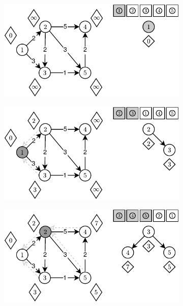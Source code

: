 \begin{figure}[!htbp]
	\centering
	\begin{subfigure}[b]{0.33\textwidth}
		\includegraphics[width=\textwidth]{Chapter_II/R-HEAP-Example/a.pdf}
		\caption{}
	\end{subfigure}%
	\begin{subfigure}[b]{0.33\textwidth}
		\includegraphics[width=\textwidth]{Chapter_II/R-HEAP-Example/b.pdf}
		\caption{}
	\end{subfigure}
	\begin{subfigure}[b]{0.33\textwidth}
		\includegraphics[width=\textwidth]{Chapter_II/R-HEAP-Example/c.pdf}

\end{subfigure}
\end{figure}
